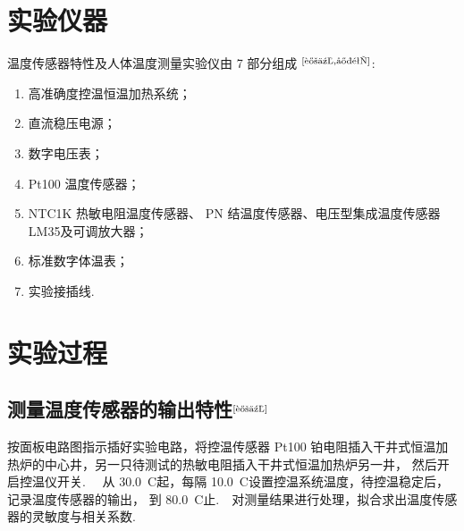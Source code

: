 \documentclass[a4paper,12pt]{article}%
\begin{document}
\section{实验仪器}
\begin{spacing}{1.528}%
温度传感器特性及人体温度测量实验仪由 7 部分组成
$^\text{\cite{讲义,实验}}$:
\begin{enumerate}
\item 高准确度控温恒温加热系统；
\item 直流稳压电源；
\item 数字电压表；
\item Pt100 温度传感器；
\item NTC1K 热敏电阻温度传感器、 PN 结温度传感器、电压型集成温度传感器 LM35及可调放大器；
\item 标准数字体温表；
\item 实验接插线.~~
\end{enumerate}
\end{spacing}

\section{实验过程}
\subsection{测量温度传感器的输出特性$^\text{\cite{讲义}}$}
\begin{spacing}{1.528}%
    按面板电路图指示插好实验电路，将控温传感器 Pt100 铂电阻插入干井式恒温加热炉的中心井，另一只待测试的热敏电阻插入干井式恒温加热炉另一井，
    然后开启控温仪开关.~~ 从 30.0~\degree  C起，每隔 10.0~\degree  C设置控温系统温度，待控温稳定后，记录温度传感器的输出，
    到 80.0~\degree  C止.~~对测量结果进行处理，拟合求出温度传感器的灵敏度与相关系数.~~
\end{spacing}
\end{document}
